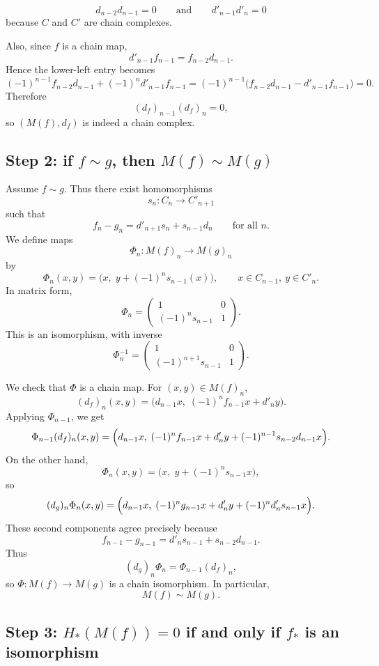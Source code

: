 \documentclass[12pt,a4paper]{article}
\theoremstyle{notespace}
\begin{document}
\[
d_{n-2}d_{n-1}=0
\qquad\text{and}\qquad
d'_{n-1}d'_n=0
\]
because \(C\) and \(C'\) are chain complexes.

Also, since \(f\) is a chain map,
\[
d'_{n-1}f_{n-1}=f_{n-2}d_{n-1}.
\]
Hence the lower-left entry becomes
\[
(-1)^{n-1}f_{n-2}d_{n-1}+(-1)^n d'_{n-1}f_{n-1}
=
(-1)^{n-1}\bigl(f_{n-2}d_{n-1}-d'_{n-1}f_{n-1}\bigr)=0.
\]
Therefore
\[
(d_f)_{n-1}(d_f)_n=0,
\]
so \((M(f),d_f)\) is indeed a chain complex.

\subsection{Step 2: if \(f\sim g\), then \(M(f)\sim M(g)\)}

Assume \(f\sim g\). Thus there exist homomorphisms
\[
s_n:C_n\to C'_{n+1}
\]
such that
\[
f_n-g_n=d'_{n+1}s_n+s_{n-1}d_n
\qquad\text{for all }n.
\]
We define maps
\[
\Phi_n:M(f)_n\to M(g)_n
\]
by
\[
\Phi_n(x,y)=\bigl(x,\; y+(-1)^n s_{n-1}(x)\bigr),
\qquad x\in C_{n-1},\ y\in C'_n.
\]
In matrix form,
\[
\Phi_n=
\begin{pmatrix}
	1 & 0\\
	(-1)^n s_{n-1} & 1
\end{pmatrix}.
\]
This is an isomorphism, with inverse
\[
\Phi_n^{-1}=
\begin{pmatrix}
	1 & 0\\
	(-1)^{n+1}s_{n-1} & 1
\end{pmatrix}.
\]

We check that \(\Phi\) is a chain map. For \((x,y)\in M(f)_n\),
\[
(d_f)_n(x,y)=\bigl(d_{n-1}x,\; (-1)^n f_{n-1}x+d'_n y\bigr).
\]
Applying \(\Phi_{n-1}\), we get
\[
\Phi_{n-1}(d_f)_n(x,y)
=
\Bigl(
d_{n-1}x,\;
(-1)^n f_{n-1}x+d'_n y+(-1)^{n-1}s_{n-2}d_{n-1}x
\Bigr).
\]
On the other hand,
\[
\Phi_n(x,y)=\bigl(x,\; y+(-1)^n s_{n-1}x\bigr),
\]
so
\[
(d_g)_n\Phi_n(x,y)
=
\Bigl(
d_{n-1}x,\;
(-1)^n g_{n-1}x+d'_n y+(-1)^n d'_n s_{n-1}x
\Bigr).
\]
These second components agree precisely because
\[
f_{n-1}-g_{n-1}=d'_n s_{n-1}+s_{n-2}d_{n-1}.
\]
Thus
\[
(d_g)_n\Phi_n=\Phi_{n-1}(d_f)_n,
\]
so \(\Phi:M(f)\to M(g)\) is a chain isomorphism. In particular,
\[
M(f)\sim M(g).
\]

\subsection{Step 3: \(H_*(M(f))=0\) if and only if \(f_*\) is an isomorphism}
\end{document}

